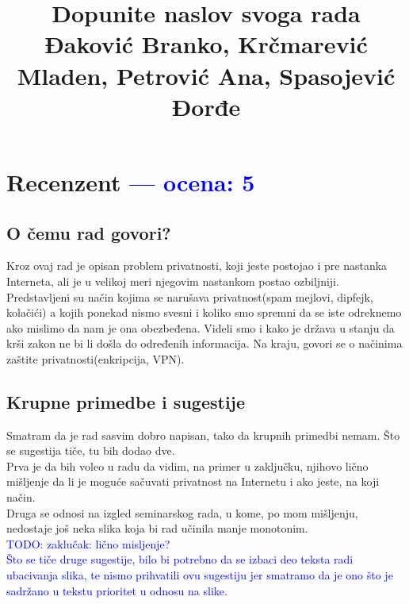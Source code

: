 \documentclass[a4paper]{report}
\newcommand{\odgovor}[1]{\textcolor{blue}{#1}}
\begin{document}
\title{Dopunite naslov svoga rada\\ \small{Đaković Branko, Krčmarević Mladen, Petrović Ana, Spasojević Đorđe}}

\maketitle

\tableofcontents


\chapter{Recenzent \odgovor{--- ocena: 5} }


\section{O čemu rad govori?}
Kroz ovaj rad je opisan problem privatnosti, koji jeste postojao i pre nastanka Interneta, ali je u velikoj meri njegovim nastankom postao ozbiljniji. Predstavljeni su način kojima se narušava privatnost(spam mejlovi, dipfejk, kolačići) a kojih ponekad nismo svesni i koliko smo spremni da se iste odreknemo ako mislimo da nam je ona obezbeđena. Videli smo i kako je država u stanju da krši zakon ne bi li došla do određenih informacija. Na kraju, govori se o načinima zaštite privatnosti(enkripcija, VPN).

\section{Krupne primedbe i sugestije}
Smatram da je rad sasvim dobro napisan, tako da krupnih primedbi nemam. Što se sugestija tiče, tu bih dodao dve.\\
Prva je da bih voleo u radu da vidim, na primer u zaključku, njihovo lično mišljenje da li je moguće sačuvati privatnost na Internetu i ako jeste, na koji način.\\
Druga se odnosi na izgled seminarskog rada, u kome, po mom mišljenju, nedostaje još neka slika koja bi rad učinila manje monotonim.
\\
\odgovor{TODO: zaklučak: lično misljenje? \\ Što se tiče druge sugestije, bilo bi potrebno da se izbaci deo teksta radi ubacivanja slika, te nismo prihvatili ovu sugestiju jer smatramo da je ono što je sadržano u tekstu prioritet u odnosu na slike.}
\end{document}
